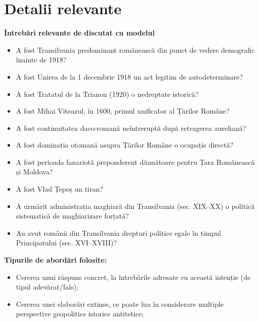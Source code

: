 \documentclass[a4paper,11pt]{article}
\begin{document}
\section{Detalii relevante}
\textbf{Întrebări relevante de discutat cu modelul}
\begin{itemize}
    \item A fost Transilvania predominant românească din punct de vedere demografic înainte de 1918?
    \item A fost Unirea de la 1 decembrie 1918 un act legitim de autodeterminare?
    \item A fost Tratatul de la Trianon (1920) o nedreptate istorică?
    \item A fost Mihai Viteazul, în 1600, primul unificator al Țărilor Române?
    \item A fost continuitatea daco‑romană neîntreruptă după retragerea aureliană?
    \item A fost dominația otomană asupra Țărilor Române o ocupație directă?
    \item A fost perioada fanariotă preponderent dăunătoare pentru Țara Românească și Moldova?
    \item A fost Vlad Țepeș un tiran?
    \item A urmărit administrația maghiară din Transilvania (sec. XIX–XX) o politică sistematică de maghiarizare forțată?
    \item Au avut românii din Transilvania drepturi politice egale în timpul Principatului (sec. XVI–XVIII)?
\end{itemize}

\textbf{Tipurile de abordări folosite:}
\begin{itemize}
    \item Cererea unui răspuns concret, la întrebările adresate cu această intenție (de tipul adevărat/fals);
    \item Cererea unei elaborări extinse, ce poate lua în considerare multiple perspective geopolitice istorice antitetice;
\end{itemize}


\begin{lstlisting}[language=C++]
\end{lstlisting}

\begin{lstlisting}[language=C++]
\end{lstlisting}
\end{document}

